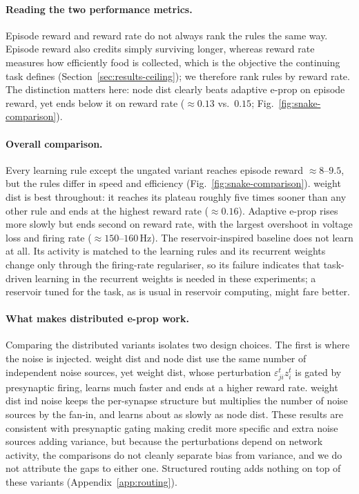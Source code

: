 \documentclass[10pt,twocolumn]{article}
\newcommand{\variant}[1]{\textsf{#1}} %
\begin{document}
\paragraph{Reading the two performance metrics.}
Episode reward and reward rate do not always rank the rules the same way.
Episode reward also credits simply surviving longer, whereas reward rate
measures how efficiently food is collected, which is the objective the
continuing task defines (Section~\ref{sec:results-ceiling}); we therefore rank
rules by reward rate. The distinction matters here: \variant{node dist} clearly
beats adaptive e-prop on episode reward, yet ends below it on reward rate
($\approx 0.13$ vs.\ $0.15$; Fig.~\ref{fig:snake-comparison}).

\paragraph{Overall comparison.}
Every learning rule except the ungated variant reaches episode reward
$\approx 8$--$9.5$, but the rules differ in speed and efficiency
(Fig.~\ref{fig:snake-comparison}). \variant{weight dist} is best throughout: it
reaches its plateau roughly five times sooner than any other rule and ends at
the highest reward rate ($\approx 0.16$). Adaptive e-prop rises more slowly but
ends second on reward rate, with the largest overshoot in voltage loss and
firing rate ($\approx 150$--$160$\,Hz). The reservoir-inspired baseline does not
learn at all. Its activity is matched to the learning rules and its recurrent
weights change only through the firing-rate regulariser, so its failure
indicates that task-driven learning in the recurrent weights is needed in these
experiments; a reservoir tuned for the task, as is usual in reservoir
computing, might fare better.

\paragraph{What makes distributed e-prop work.}
Comparing the distributed variants isolates two design choices. The first is
where the noise is injected. \variant{weight dist} and \variant{node dist} use
the same number of independent noise sources, yet \variant{weight dist}, whose
perturbation $\varepsilon^t_{ji}z^t_i$ is gated by presynaptic firing, learns
much faster and ends at a higher reward rate. \variant{weight dist ind noise}
keeps the per-synapse structure but multiplies the number of noise sources by
the fan-in, and learns about as slowly as \variant{node dist}. These results are
consistent with presynaptic gating making credit more specific and extra noise
sources adding variance, but because the perturbations depend on network
activity, the comparisons do not cleanly separate bias from variance, and we do
not attribute the gaps to either one. Structured routing adds nothing on top of
these variants (Appendix~\ref{app:routing}).
\end{document}
